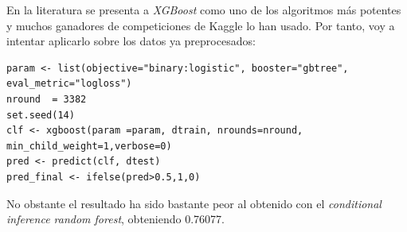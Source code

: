 En la literatura se presenta a \textit{XGBoost} como uno de los algoritmos más potentes y muchos ganadores de competiciones de Kaggle lo han usado. Por tanto, voy a intentar aplicarlo sobre los datos ya preprocesados:

\begin{lstlisting}[style=R]
param <- list(objective="binary:logistic", booster="gbtree", eval_metric="logloss")
nround  = 3382
set.seed(14)
clf <- xgboost(param =param, dtrain, nrounds=nround, min_child_weight=1,verbose=0)
pred <- predict(clf, dtest)
pred_final <- ifelse(pred>0.5,1,0) 
\end{lstlisting}

No obstante el resultado ha sido bastante peor al obtenido con el \textit{conditional inference random forest}, obteniendo 0.76077.



\newpage


